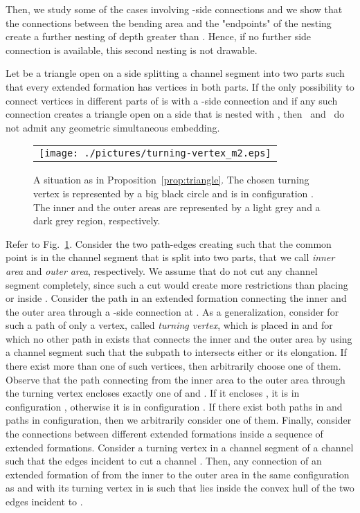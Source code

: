 \documentclass[a4paper,10pt]{llncs}
\newcounter{prop}
\newcommand{\T}{\mbox{ }}
\renewcommand{\P}{\mbox{ }}
\begin{document}
Then, we study some of the cases involving -side connections and we show that the connections between the bending area and the "endpoints" of the nesting create a further nesting of depth greater than . Hence, if no further side connection is available, this second nesting is not drawable.

\begin{proposition}\label{prop:triangle}
Let  be a triangle open on a side splitting a channel segment  into two parts such that every extended formation  has vertices in both parts. If the only possibility to connect vertices in different parts of  is with a -side connection and if any such connection creates a triangle open on a side that is nested with , then \T and \P do not admit any geometric simultaneous embedding.
\end{proposition}

\begin{figure}[htb]
\begin{center}
\begin{tabular}{c}
\mbox{\texttt{[image: ./pictures/turning-vertex\_m2.eps]}} \hspace{0.2cm}
\end{tabular}
\caption{A situation as in Proposition~\ref{prop:triangle}. The chosen turning vertex is represented by a big black circle and is in configuration . The inner and the outer areas are represented by a light grey and a dark grey region, respectively.}
\label{fig:turning-vertex}
\end{center}
\end{figure}

Refer to Fig.~\ref{fig:turning-vertex}. Consider the two path-edges  creating  such that the common point  is in the channel segment  that is split into two parts, that we call {\it inner area} and {\it outer area}, respectively. We assume that  do not cut any channel segment  completely, since such a cut would create more restrictions than placing  or  inside . Consider the path in an extended formation  connecting the inner and the outer area through a -side connection at . As a generalization, consider for such a path of  only a vertex, called \emph{turning vertex}, which is placed in  and for which no other path in  exists that connects the inner and the outer area by using a channel segment  such that the subpath to  intersects either  or its elongation. If there exist more than one of such vertices, then arbitrarily choose one of them. Observe that the path connecting from the inner area to the outer area through the turning vertex encloses exactly one of  and . If it encloses , it is in configuration , otherwise it is in configuration . If there exist both paths in  and paths in  configuration, then we arbitrarily consider one of them. Finally, consider the connections between different extended formations inside a sequence of extended formations. Consider a turning vertex  in a channel segment  of a channel  such that the edges incident to  cut a channel . Then, any connection of an extended formation of  from the inner to the outer area in the same configuration as  and with its turning vertex  in  is such that  lies inside the convex hull of the two edges incident to .
\end{document}
